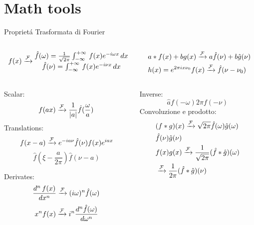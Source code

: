 \section{Math tools}

\begin{wordonframe}{Propriet\'a Trasformata di Fourier}
\begin{columns}
\begin{column}{0.5\textwidth}
\begin{align*}
f(x)\xrightarrow{\mathcal{F}}{}\begin{matrix}
\hat{f}(\omega)=\frac{1}{\sqrt{2\pi}}\int_{-\infty}^{+\infty}\,f(x)e^{-i\omega x}\,dx\\
\hat{f}(\nu)=\int_{-\infty}^{+\infty}\,f(x)e^{-i\nu x}\,dx\\
\end{matrix}
\end{align*}
\end{column}

\begin{column}{0.5\textwidth}
\begin{align*}
&a*f(x)+bg(x)\xrightarrow{\mathcal{F}}{}a\hat{f}(\nu)+b\hat{g}(\nu)\\
&h(x)=e^{2\pi ix\nu_0}f(x)\xrightarrow{\mathcal{F}}{}\hat{f}(\nu-\nu_0)
\end{align*}
\end{column}
\end{columns}

\begin{columns}
\begin{column}{0.5\textwidth}
Scalar: \[f(ax)\xrightarrow{\mathcal{F}}{}\frac{1}{|a|}\hat{f}(\frac{\omega}{a}) \]
Translations:
\[f(x-a)\xrightarrow{\mathcal{F}}{}e^{-ia\nu}\hat{f}(\nu)f(x)e^{iax}\]
\[\hat{f}(\xi-\frac{a}{2\pi}) \hat{f}(\nu-a)\]

Derivates:
\[\frac{d^n\,f(x)}{dx^n}\xrightarrow{\mathcal{F}}{}(i\omega)^n\hat{f}(\omega)\]
\[x^nf(x)\xrightarrow{\mathcal{F}}{}i^n\frac{d^n\hat{f}(\omega)}{d\omega^n}\]
\end{column}
\begin{column}{0.5\textwidth}
Inverse: \[\hat{a} f(-\omega) 2\pi f(-\nu)\]
Convoluzione e prodotto:
\begin{align*}
&(f*g)(x)\xrightarrow{\mathcal{F}}{}\sqrt{2\pi}\hat{f}(\omega)\hat{g}(\omega)\\
&\hat{f}(\nu)\hat{g}(\nu)\\
&f(x)g(x)\xrightarrow{\mathcal{F}}{}\frac{1}{\sqrt{2\pi}}(\hat{f}*\hat{g})(\omega)\\
&\xrightarrow{\mathcal{F}}{}\frac{1}{2\pi}(\hat{f}*\hat{g})(\nu)
\end{align*}

\end{column}
\end{columns}
\end{wordonframe}

